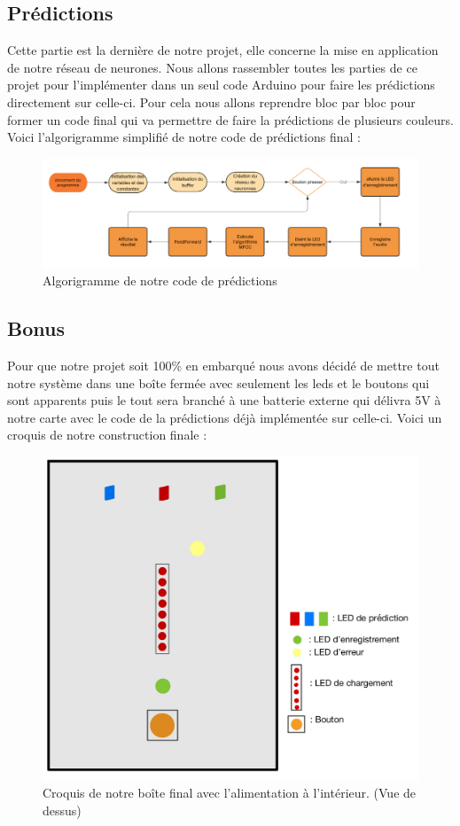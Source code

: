 \documentclass[a4paper,11pt]{article}
\begin{document}
\subsection{Prédictions}
Cette partie est la dernière de notre projet, elle concerne la mise en application de notre réseau de neurones. Nous allons rassembler toutes les parties de ce projet pour l'implémenter dans un seul code Arduino pour faire les prédictions directement sur celle-ci. Pour cela nous allons reprendre bloc par bloc pour former un code final qui va permettre de faire la prédictions de plusieurs couleurs. Voici l'algorigramme simplifié de notre code de prédictions final : 
\begin{figure}[H]
\centering
\includegraphics[scale=0.5]{images/algo_prediction.png} 
\caption{Algorigramme de notre code de prédictions}\label{fig:prediction}
\end{figure}

\subsection{Bonus}
Pour que notre projet soit 100\% en embarqué nous avons décidé de mettre tout notre système dans une boîte fermée avec seulement les leds et le boutons qui sont apparents puis le tout sera branché à une batterie externe qui délivra 5V à notre carte avec le code de la prédictions déjà implémentée sur celle-ci. Voici un croquis de notre construction finale : 
\begin{figure}[H]
\begin{center}
\includegraphics[scale=0.15]{images/boite.jpg}
\caption{Croquis de notre boîte final avec l'alimentation à l'intérieur. (Vue de dessus)}
\end{center}
\end{figure}
\end{document}
